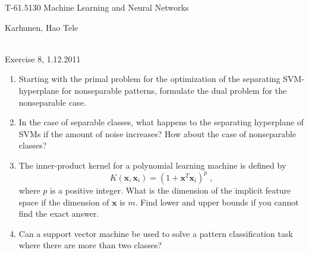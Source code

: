 \documentclass[10pt]{article}
\renewcommand{\vec}[1]{\mathbf{#1}}
\newcommand{\x}{\vec{x}}
\begin{document}
\pagestyle{empty}
\begin{Large}
\begin{bf} 
T-61.5130 Machine Learning and Neural Networks\\ 
\end{bf}
\end{Large}
Karhunen, Hao Tele\\  
\\
\begin{large}
\begin{bf}
Exercise 8,  1.12.2011
\end{bf}
\end{large}
\begin{enumerate}

\item Starting with the primal problem for the optimization of the
  separating SVM-hyperplane for nonseparable patterns, formulate the
  dual problem for the nonseparable case.

\vspace{2mm}

\item In the case of separable classes, what happens to the separating
hyperplane of SVMs if the amount of noise increases? How about the
case of nonseparable classes?

\vspace{2mm}

\item The inner-product kernel for a polynomial learning machine is
  defined by
  \begin{displaymath}
    K(\x,\x_i) = (1 + \x^T \x_i)^p \; ,
  \end{displaymath}
  where $p$ is a positive integer.  What is the dimension of the
  implicit feature space if the dimension of $\x$ is $m$.  Find lower
  and upper bounds if you cannot find the exact answer.

\vspace{2mm}

\item Can a support vector machine be used to solve a pattern
  classification task where there are more than two classes?


\end{enumerate}
\end{document}
